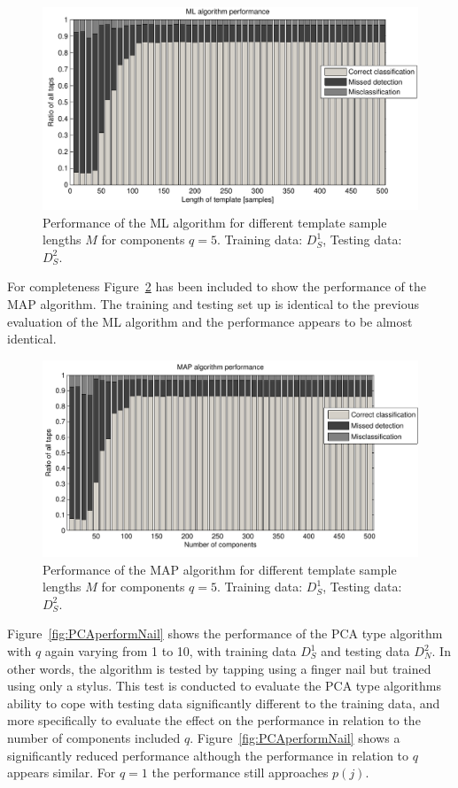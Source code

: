 \begin{figure}[!] %
\centering
\includegraphics[width=150mm]{MLperform.pdf}
\caption{Performance of the ML algorithm for different template sample lengths $M$ for components $q=5$. Training data: $D^1_S$, Testing data: $D^2_S$.}\label{fig:MLperform}
\end{figure}

For completeness Figure~\ref{fig:MAPperformLength} has been included to show the performance of the MAP algorithm. The training and testing set up is identical to the previous evaluation of the ML algorithm and the performance appears to be almost identical.

\begin{figure}[!] %
\centering
\includegraphics[width=150mm]{MAPperformLength.pdf}
\caption{Performance of the MAP algorithm for different template sample lengths $M$ for components $q=5$. Training data: $D^1_S$, Testing data: $D^2_S$.}\label{fig:MAPperformLength}
\end{figure}

Figure~\ref{fig:PCAperformNail} shows the performance of the PCA type algorithm with $q$ again varying from 1 to 10, with training data $D^1_S$ and testing data $D^2_N$. In other words, the algorithm is tested by tapping using a finger nail but trained using only a stylus. This test is conducted to evaluate the PCA type algorithms ability to cope with testing data significantly different to the training data, and more specifically to evaluate the effect on the performance in relation to the number of components included $q$. Figure~\ref{fig:PCAperformNail} shows a significantly reduced performance although the performance in relation to $q$ appears similar. For $q=1$ the performance still approaches $p(j)$.

